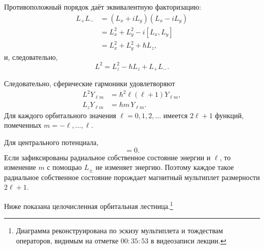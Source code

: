 Противоположный порядок даёт эквивалентную факторизацию:
\begin{align}
L_+L_-
&=(L_x+iL_y)(L_x-iL_y) \\
&=L_x^2+L_y^2-i[L_x,L_y] \\
&=L_x^2+L_y^2+\hbar L_z,
\end{align}
и, следовательно,
\begin{equation}
L^2=L_z^2-\hbar L_z+L_+L_-.
\end{equation}

\begin{classroomqa}
\end{classroomqa}

Следовательно, сферические гармоники удовлетворяют
\begin{align}
L^2Y_{\ell m}
&=\hbar^2\ell(\ell+1)Y_{\ell m}, \\
L_zY_{\ell m}
&=\hbar m\,Y_{\ell m}.
\end{align}
Для каждого орбитального значения \(\ell=0,1,2,\ldots\) имеется \(2\ell+1\) функций, помеченных \(m=-\ell,\ldots,\ell\).

Для центрального потенциала,
\begin{equation}
[H,L_i]=0.
\end{equation}
Если зафиксированы радиальное собственное состояние энергии и \(\ell\), то изменение \(m\) с помощью \(L_\pm\) не изменяет энергию. Поэтому каждое такое радиальное собственное состояние порождает магнитный мультиплет размерности \(2\ell+1\).

Ниже показана целочисленная орбитальная лестница.\footnote{Диаграмма реконструирована по эскизу мультиплета и тождествам операторов, видимым на отметке \(00{:}35{:}53\) в видеозаписи лекции.}

